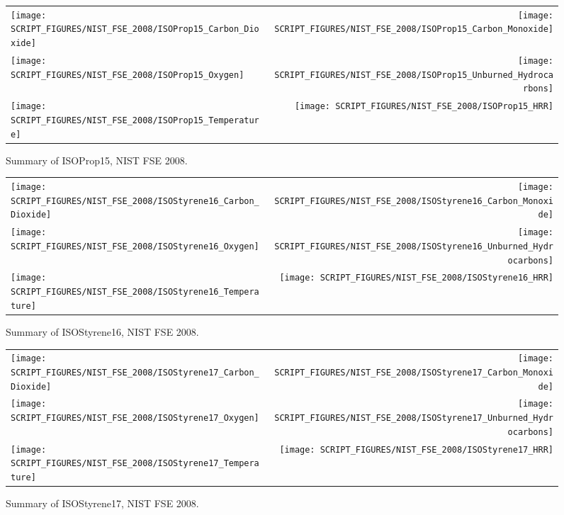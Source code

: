 \begin{figure}[p]
\begin{tabular*}{\textwidth}{l@{\extracolsep{\fill}}r}
\texttt{[image: SCRIPT\_FIGURES/NIST\_FSE\_2008/ISOProp15\_Carbon\_Dioxide]} &
\texttt{[image: SCRIPT\_FIGURES/NIST\_FSE\_2008/ISOProp15\_Carbon\_Monoxide]} \\
\texttt{[image: SCRIPT\_FIGURES/NIST\_FSE\_2008/ISOProp15\_Oxygen]} &
\texttt{[image: SCRIPT\_FIGURES/NIST\_FSE\_2008/ISOProp15\_Unburned\_Hydrocarbons]} \\
\texttt{[image: SCRIPT\_FIGURES/NIST\_FSE\_2008/ISOProp15\_Temperature]} &
\texttt{[image: SCRIPT\_FIGURES/NIST\_FSE\_2008/ISOProp15\_HRR]}
\end{tabular*}
\caption[Summary of ISOProp15, NIST FSE 2008]{Summary of ISOProp15, NIST FSE 2008.}
\label{NIST_FSE_1994_ISOProp15}
\end{figure}

\begin{figure}[p]
\begin{tabular*}{\textwidth}{l@{\extracolsep{\fill}}r}
\texttt{[image: SCRIPT\_FIGURES/NIST\_FSE\_2008/ISOStyrene16\_Carbon\_Dioxide]} &
\texttt{[image: SCRIPT\_FIGURES/NIST\_FSE\_2008/ISOStyrene16\_Carbon\_Monoxide]} \\
\texttt{[image: SCRIPT\_FIGURES/NIST\_FSE\_2008/ISOStyrene16\_Oxygen]} &
\texttt{[image: SCRIPT\_FIGURES/NIST\_FSE\_2008/ISOStyrene16\_Unburned\_Hydrocarbons]} \\
\texttt{[image: SCRIPT\_FIGURES/NIST\_FSE\_2008/ISOStyrene16\_Temperature]} &
\texttt{[image: SCRIPT\_FIGURES/NIST\_FSE\_2008/ISOStyrene16\_HRR]}
\end{tabular*}
\caption[Summary of ISOStyrene16, NIST FSE 2008]{Summary of ISOStyrene16, NIST FSE 2008.}
\label{NIST_FSE_1994_ISOStyrene16}
\end{figure}

\begin{figure}[p]
\begin{tabular*}{\textwidth}{l@{\extracolsep{\fill}}r}
\texttt{[image: SCRIPT\_FIGURES/NIST\_FSE\_2008/ISOStyrene17\_Carbon\_Dioxide]} &
\texttt{[image: SCRIPT\_FIGURES/NIST\_FSE\_2008/ISOStyrene17\_Carbon\_Monoxide]} \\
\texttt{[image: SCRIPT\_FIGURES/NIST\_FSE\_2008/ISOStyrene17\_Oxygen]} &
\texttt{[image: SCRIPT\_FIGURES/NIST\_FSE\_2008/ISOStyrene17\_Unburned\_Hydrocarbons]} \\
\texttt{[image: SCRIPT\_FIGURES/NIST\_FSE\_2008/ISOStyrene17\_Temperature]} &
\texttt{[image: SCRIPT\_FIGURES/NIST\_FSE\_2008/ISOStyrene17\_HRR]}
\end{tabular*}
\caption[Summary of ISOStyrene17, NIST FSE 2008]{Summary of ISOStyrene17, NIST FSE 2008.}
\label{NIST_FSE_1994_ISOStyrene17}
\end{figure}


